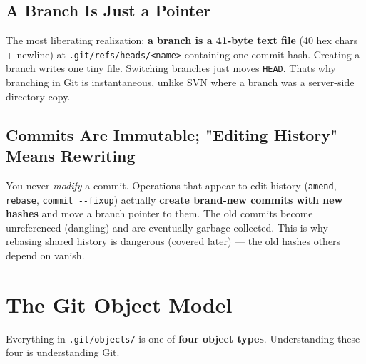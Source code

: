 \documentclass[11pt]{article}
\newenvironment{Shaded}{\begin{snugshade}}{\end{snugshade}}
\newcommand{\CommentTok}[1]{\textcolor[rgb]{0.48,0.49,0.49}{#1}}
\newcommand{\ExtensionTok}[1]{\textcolor[rgb]{0.00,0.60,1.00}{\textbf{#1}}}
\newcommand{\NormalTok}[1]{\textcolor[rgb]{0.81,0.81,0.76}{#1}}
\begin{document}
\subsection{A Branch Is Just a Pointer}\label{a-branch-is-just-a-pointer}

The most liberating realization: \textbf{a branch is a 41-byte text file} (40 hex chars + newline) at \texttt{.git/refs/heads/\textless{}name\textgreater{}} containing one commit hash. Creating a branch writes one tiny file. Switching branches just moves \texttt{HEAD}. That\textquotesingle s why branching in Git is instantaneous, unlike SVN where a branch was a server-side directory copy.


\begin{Shaded}
\end{Shaded}

\subsection{Commits Are Immutable; "Editing History" Means Rewriting}\label{commits-are-immutable-editing-history-means-rewriting}

You never \emph{modify} a commit. Operations that appear to edit history (\texttt{amend}, \texttt{rebase}, \texttt{commit\ -\/-fixup}) actually \textbf{create brand-new commits with new hashes} and move a branch pointer to them. The old commits become unreferenced (dangling) and are eventually garbage-collected. This is why rebasing shared history is dangerous (covered later) --- the old hashes others depend on vanish.

\section{The Git Object Model}\label{the-git-object-model}

Everything in \texttt{.git/objects/} is one of \textbf{four object types}. Understanding these four is understanding Git.
\end{document}
